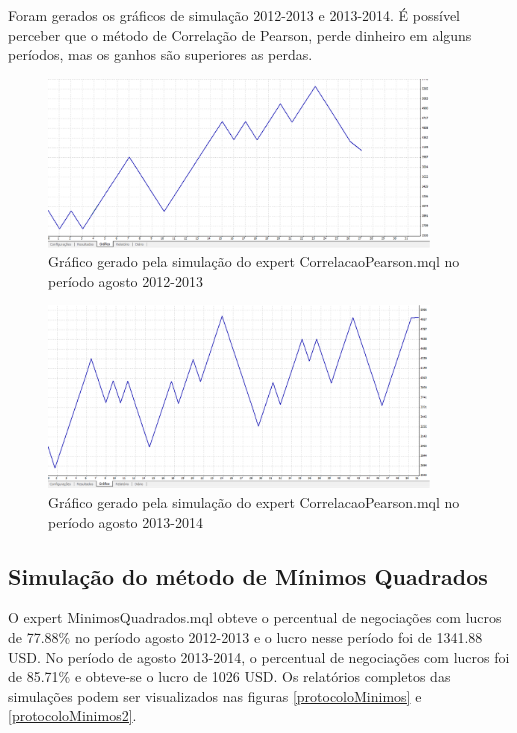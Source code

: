 Foram gerados os gráficos de simulação 2012-2013 e 2013-2014. É possível perceber que o método de Correlação de Pearson, perde dinheiro em alguns períodos, mas os ganhos são superiores as perdas.

\begin{figure}[H]
\centering
\includegraphics[width=0.9\textwidth]{figuras/protocoloCorrelacao3}
\caption{Gráfico gerado pela simulação do expert CorrelacaoPearson.mql no período agosto 2012-2013}
\label{protocoloCorrelacao3}
\end{figure}

\begin{figure}[H]
\centering
\includegraphics[width=0.9\textwidth]{figuras/protocoloCorrelacao4}
\caption{Gráfico gerado pela simulação do expert CorrelacaoPearson.mql no período agosto 2013-2014}
\label{protocoloCorrelacao4}
\end{figure}

\subsection{Simulação do método de Mínimos Quadrados}

O expert MinimosQuadrados.mql obteve o percentual de negociações com lucros de 77.88\% no período agosto 2012-2013 e o  lucro nesse período foi de 1341.88 USD.
 No período de agosto 2013-2014, o percentual de negociações com lucros foi de 85.71\%  e obteve-se o lucro de 1026 USD. 
Os relatórios completos das simulações podem ser visualizados nas figuras \ref{protocoloMinimos} e \ref{protocoloMinimos2}.

